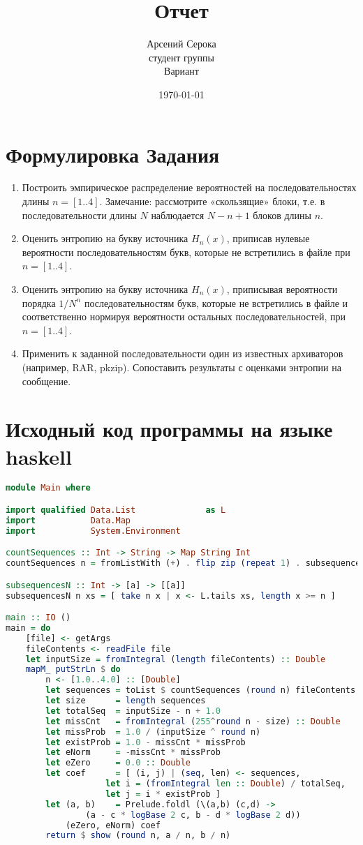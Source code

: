 \documentclass{article}
\title{Отчет}
\author{Арсений Серока\\ студент группы \textnumero 4538\\Вариант \textnumero 19}
\date{\today}
\begin{document}
\maketitle

\section{Формулировка Задания}
\begin{enumerate}
\def \n {$n = [1..4]$}
\def \Hn {$H_n(x)$}
\item Построить эмпирическое распределение вероятностей на последовательностях длины \n. Замечание: рассмотрите «скользящие» блоки, т.е. в последовательности длины $N$ наблюдается $N-n+1$ блоков длины $n$.
\item Оценить энтропию на букву источника \Hn, приписав нулевые вероятности последовательностям букв, которые не встретились в файле при \n. 
\item Оценить энтропию на букву источника \Hn, приписывая вероятности порядка $1 / N^n$ последовательностям букв, которые не встретились в файле и соответственно нормируя вероятности остальных последовательностей, при \n.
\item Применить к заданной последовательности один из известных архиваторов (например, RAR, pkzip). Сопоставить результаты с оценками энтропии на сообщение.
\end{enumerate}
\newpage
\section{Исходный код программы на языке haskell}

\begin{lstlisting}[language=haskell]
module Main where

import qualified Data.List              as L
import           Data.Map
import           System.Environment

countSequences :: Int -> String -> Map String Int
countSequences n = fromListWith (+) . flip zip (repeat 1) . subsequencesN n

subsequencesN :: Int -> [a] -> [[a]]
subsequencesN n xs = [ take n x | x <- L.tails xs, length x >= n ]

main :: IO ()
main = do
    [file] <- getArgs
    fileContents <- readFile file
    let inputSize = fromIntegral (length fileContents) :: Double
    mapM_ putStrLn $ do
        n <- [1.0..4.0] :: [Double]
        let sequences = toList $ countSequences (round n) fileContents
        let size      = length sequences
        let totalSeq  = inputSize - n + 1.0
        let missCnt   = fromIntegral (255^round n - size) :: Double
        let missProb  = 1.0 / (inputSize ^ round n)
        let existProb = 1.0 - missCnt * missProb
        let eNorm     = -missCnt * missProb
        let eZero     = 0.0 :: Double
        let coef      = [ (i, j) | (seq, len) <- sequences,
                    let i = (fromIntegral len :: Double) / totalSeq, 
                    let j = i * existProb ]
        let (a, b)    = Prelude.foldl (\(a,b) (c,d) -> 
                (a - c * logBase 2 c, b - d * logBase 2 d))
            (eZero, eNorm) coef
        return $ show (round n, a / n, b / n)
\end{lstlisting}
\newpage
\end{document}
